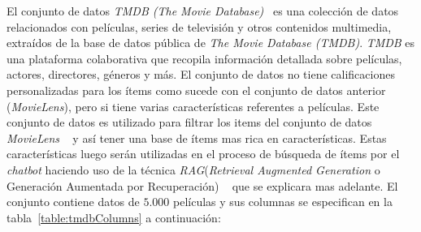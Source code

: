 \documentclass[11pt,a4paper,twoside]{thesis}
\begin{document}
El conjunto de datos \textit{TMDB (The Movie Database)}~\cite{tmdb} es una colección de datos relacionados con películas, series de televisión y otros contenidos multimedia, extraídos de la base de datos pública de \textit{The Movie Database (TMDB)}. \textit{TMDB} es una plataforma colaborativa que recopila información detallada sobre películas, actores, directores, géneros y más.
El conjunto de datos no tiene calificaciones personalizadas para los ítems como sucede con el conjunto de datos anterior (\textit{MovieLens}), pero si tiene varias características referentes a películas. Este conjunto de datos es utilizado para filtrar los items del conjunto de datos \textit{MovieLens} ~\cite{movielens} y así tener una base de ítems mas rica en características. Estas características luego serán utilizadas en el proceso de búsqueda de ítems por el \textit{chatbot} haciendo uso de la técnica \textit{RAG}(\textit{Retrieval Augmented Generation} o Generación Aumentada por Recuperación) ~\cite{rag} que se explicara mas adelante. El conjunto contiene datos de $5.000$ películas y sus columnas se especifican en la tabla~\ref{table:tmdbColumns} a
continuación:
\end{document}
